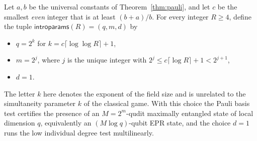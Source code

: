 \begin{definition}\label{def:introparams}
	\leanok
	Let $a, b$ be the universal constants of Theorem~\ref{thm:pauli}, and let $c$ be the smallest \emph{even} integer that is at least $(b+a)/b$. For every integer $R \ge 4$, define the tuple $\mathsf{introparams}(R) = (q, m, d)$ by
	\begin{itemize}
		\item $q = 2^k$ for $k = c \lceil \log \log R \rceil + 1$,
		\item $m = 2^j$, where $j$ is the unique integer with $2^j \le c \lceil \log R \rceil + 1 < 2^{j+1}$,
		\item $d = 1$.
	\end{itemize}
	The letter $k$ here denotes the exponent of the field size and is unrelated to the simultaneity parameter $k$ of the classical game. With this choice the Pauli basis test certifies the presence of an $M = 2^m$-qudit maximally entangled state of local dimension $q$, equivalently an $(M \log q)$-qubit EPR state, and the choice $d = 1$ runs the low individual degree test multilinearly.
\end{definition}

